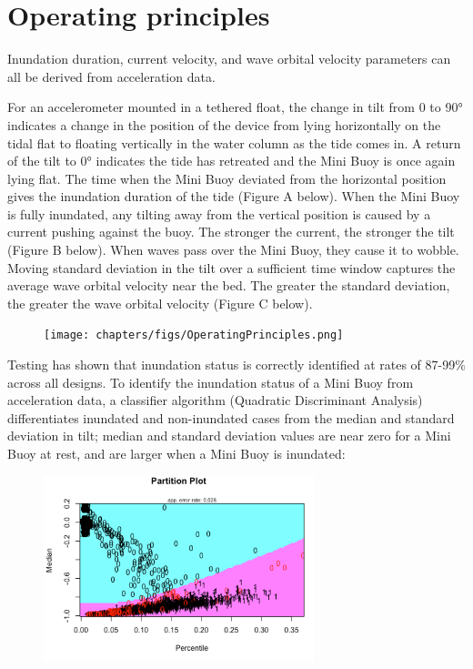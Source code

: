\documentclass[
  letterpaper,
  DIV=11,
  numbers=noendperiod]{scrreprt}
\begin{document}
\hypertarget{operating-principles}{%
\section{Operating principles}\label{operating-principles}}

Inundation duration, current velocity, and wave orbital velocity
parameters can all be derived from acceleration data.

For an accelerometer mounted in a tethered float, the change in tilt
from 0 to 90° indicates a change in the position of the device from
lying horizontally on the tidal flat to floating vertically in the water
column as the tide comes in. A return of the tilt to 0° indicates the
tide has retreated and the Mini Buoy is once again lying flat. The time
when the Mini Buoy deviated from the horizontal position gives the
inundation duration of the tide (Figure A below). When the Mini Buoy is
fully inundated, any tilting away from the vertical position is caused
by a current pushing against the buoy. The stronger the current, the
stronger the tilt (Figure B below). When waves pass over the Mini Buoy,
they cause it to wobble. Moving standard deviation in the tilt over a
sufficient time window captures the average wave orbital velocity near
the bed. The greater the standard deviation, the greater the wave
orbital velocity (Figure C below).

\begin{figure}

{\centering \texttt{[image: chapters/figs/OperatingPrinciples.png]}

}

\end{figure}

Testing has shown that inundation status is correctly identified at
rates of 87-99\% across all designs. To identify the inundation status
of a Mini Buoy from acceleration data, a classifier algorithm (Quadratic
Discriminant Analysis) differentiates inundated and non-inundated cases
from the median and standard deviation in tilt; median and standard
deviation values are near zero for a Mini Buoy at rest, and are larger
when a Mini Buoy is inundated:

\begin{figure}

{\centering \includegraphics[width=0.7\textwidth,height=\textheight]{chapters/figs/QDA.png}

}

\end{figure}
\end{document}

